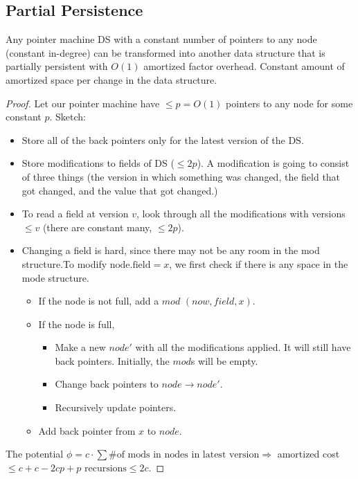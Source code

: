 \documentclass[11pt]{scrartcl}
\begin{document}
\subsection{Partial Persistence}
\begin{claim}
Any pointer machine DS with a  constant number of pointers to any node (constant in-degree) can be transformed into another data structure that is partially persistent with $O(1)$ amortized factor overhead. Constant amount of amortized space per change in the data structure.
\end{claim}
\begin{proof}
	Let our pointer machine have $\le p = O(1)$ pointers to any node for some constant $p$.
Sketch:
	\begin{itemize}
		\item Store all of the back pointers only for the latest version of the DS. 
		\item Store modifications to fields of DS ($\le 2p$). A modification is going to consist of three things (the version in which something was changed, the field that got changed, and the value that got changed.)
		\item To read a field at version $v$, look through all the modifications with versions $\le v$ (there are constant many, $\le 2p$).
		\item Changing a field is hard, since there may not be any room in the mod structure.To modify $\text{node.field} = x$, we first check if there is any space in the mode structure. 
		\begin{itemize}
			\item If the node is not full, add a $mod$ $(now, field, x)$.
			\item If the node is full, 
		\begin{itemize}
			\item Make a new $node'$ with all the modifications applied. It will still have back pointers. Initially, the $mod$s will be empty.
			\item Change back pointers to $node \to node'$.
			\item Recursively update pointers.
		\end{itemize}
	\item Add back pointer from $x$ to $node$.
	\end{itemize}
\end{itemize}
The potential $\phi = c \cdot \sum \# \text{of mods in nodes in latest version} \Longrightarrow$ amortized cost $\le c + c - 2cp + p \text{ recursions}\le 2c$. 
\end{proof}
\end{document}
